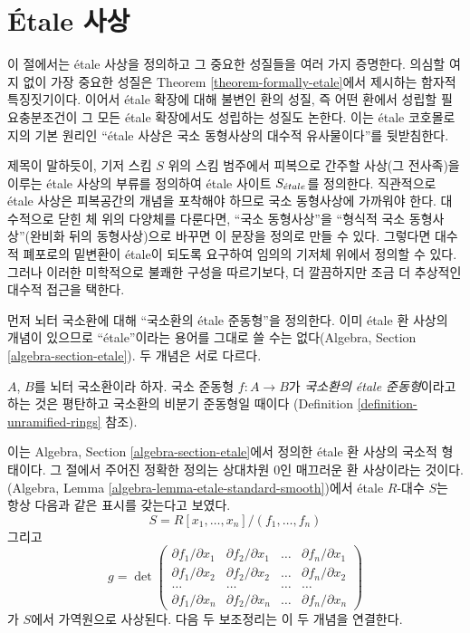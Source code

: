 \section{\'Etale 사상}
\label{section-etale-morphisms}

\noindent
이 절에서는 \'etale 사상을 정의하고 그 중요한 성질들을 여러 가지
증명한다. 의심할 여지 없이 가장 중요한 성질은 Theorem
\ref{theorem-formally-etale}에서 제시하는 함자적 특징짓기이다.
이어서 \'etale 확장에 대해 불변인 환의 성질, 즉 어떤 환에서 성립할
필요충분조건이 그 모든 \'etale 확장에서도 성립하는 성질도 논한다.
이는 \'etale 코호몰로지의 기본 원리인 “\'etale 사상은 국소
동형사상의 대수적 유사물이다”를 뒷받침한다.

\medskip\noindent
제목이 말하듯이, 기저 스킴 $S$ 위의 스킴 범주에서 피복으로
간주할 사상(그 전사족)을 이루는 \'etale 사상의 부류를 정의하여
\'etale 사이트 $S_{\acute{e}tale}$를 정의한다.
직관적으로 \'etale 사상은 피복공간의 개념을 포착해야 하므로
국소 동형사상에 가까워야 한다. 대수적으로 닫힌 체 위의 다양체를
다룬다면, “국소 동형사상”을 “형식적 국소 동형사상”(완비화 뒤의
동형사상)으로 바꾸면 이 문장을 정의로 만들 수 있다.
그렇다면 대수적 폐포로의 밑변환이 \'etale이 되도록 요구하여
임의의 기저체 위에서 정의할 수 있다. 그러나 이러한 미학적으로
불쾌한 구성을 따르기보다, 더 깔끔하지만 조금 더 추상적인
대수적 접근을 택한다.

\medskip\noindent
먼저 뇌터 국소환에 대해 “국소환의 \'etale 준동형”을 정의한다.
이미 \'etale 환 사상의 개념이 있으므로 “\'etale”이라는 용어를
그대로 쓸 수는 없다(Algebra, Section
\ref{algebra-section-etale}). 두 개념은 서로 다르다.

\begin{definition}
\label{definition-etale-ring}
$A$, $B$를 뇌터 국소환이라 하자.
국소 준동형 $f : A \to B$가 {\it 국소환의 \'etale 준동형}이라고
하는 것은 평탄하고 국소환의 비분기 준동형일 때이다
(Definition \ref{definition-unramified-rings} 참조).
\end{definition}

\noindent
이는 Algebra, Section \ref{algebra-section-etale}에서 정의한
\'etale 환 사상의 국소적 형태이다. 그 절에서 주어진 정확한
정의는 상대차원 $0$인 매끄러운 환 사상이라는 것이다.
(Algebra, Lemma \ref{algebra-lemma-etale-standard-smooth})에서
\'etale $R$-대수 $S$는 항상 다음과 같은 표시를 갖는다고 보였다.
$$
S = R[x_1, \ldots, x_n]/(f_1, \ldots, f_n)
$$
그리고
$$
g =
\det
\left(
\begin{matrix}
\partial f_1/\partial x_1 &
\partial f_2/\partial x_1 &
\ldots &
\partial f_n/\partial x_1 \\
\partial f_1/\partial x_2 &
\partial f_2/\partial x_2 &
\ldots &
\partial f_n/\partial x_2 \\
\ldots & \ldots & \ldots & \ldots \\
\partial f_1/\partial x_n &
\partial f_2/\partial x_n &
\ldots &
\partial f_n/\partial x_n
\end{matrix}
\right)
$$
가 $S$에서 가역원으로 사상된다. 다음 두 보조정리는
이 두 개념을 연결한다.

